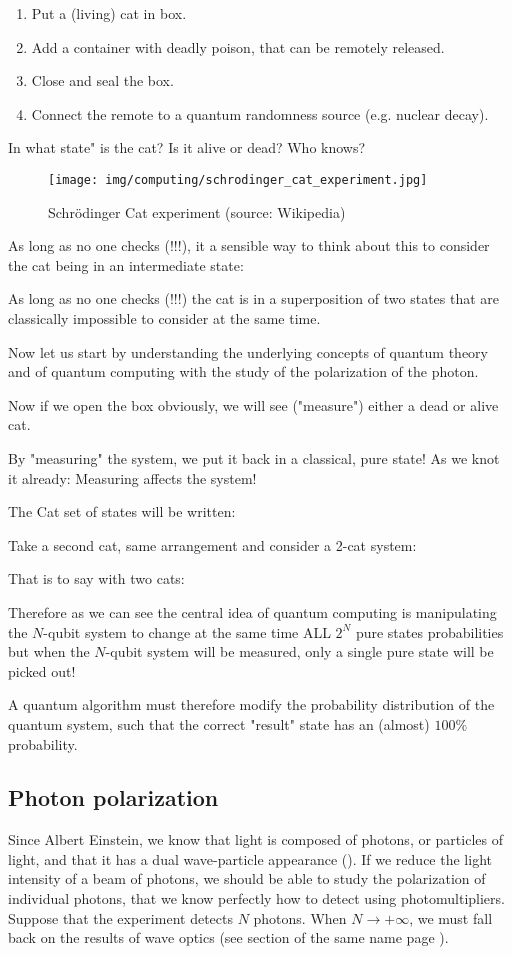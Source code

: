	\begin{enumerate}
		\item Put a (living) cat in box.
		\item Add a container with deadly poison, that can be remotely released.
		\item Close and seal the box.
		\item Connect the remote to a quantum randomness source (e.g. nuclear decay).
	\end{enumerate}
	In what state" is the cat? Is it alive or dead? Who knows?
	\begin{figure}[H]
		\centering
		\texttt{[image: img/computing/schrodinger\_cat\_experiment.jpg]}
		\caption[Schrödinger Cat experiment]{Schrödinger Cat experiment (source: Wikipedia)}
	\end{figure}
	As long as no one checks (!!!), it a sensible way to think about this to
consider the cat being in an intermediate state:
	
	As long as no one checks (!!!) the cat is in a superposition of two
states that are classically impossible to consider at the same time.

	Now let us start by understanding the underlying concepts of quantum theory and of quantum computing with the study of the polarization of the photon.
	
	Now if we open the box obviously, we will see ("measure") either a dead or alive cat.
	
	By "measuring" the system, we put it back in a classical, pure state! As we knot it already: Measuring affects the system!
	
	The Cat set of states will be written:
	
	Take a second cat, same arrangement and consider a 2-cat system:
	
	That is to say with two cats:
	
	Therefore as we can see the central idea of quantum computing is manipulating the $N$-qubit system to change at the same time ALL $2^N$ pure states probabilities but when the $N$-qubit system will be measured,
only a single pure state will be picked out!

	A quantum algorithm must therefore modify the probability distribution of the quantum system, such that the correct "result" state has an (almost) $100\% $ probability.
	
	\subsection{Photon polarization}
	Since Albert Einstein, we know that light is composed of photons, or particles of light, and that it has a dual wave-particle appearance (). If we reduce the light intensity of a beam of photons, we should be able to study the polarization of individual photons, that we know perfectly how to detect using photomultipliers. Suppose that the experiment detects $N$ photons. When $N\rightarrow +\infty$, we must fall back on the results of wave optics (see section of the same name page \pageref{wave optics}).
	
